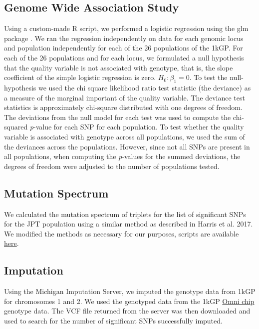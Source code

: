\documentclass[9pt,lineno]{elife}
\begin{document}
\subsection{Genome Wide Association Study}
Using a custom-made R script, we performed a logistic regression using the glm package \citep{RDevelopmentCoreTeam2016}.
We ran the regression independently on data for each genomic locus and population independently for each of the 26 populations of the 1kGP.
For each of the 26 populations and for each locus, we formulated a null hypothesis that the quality variable is not associated with genotype, that is, the slope  coefficient of the simple logistic regression is zero. 
$H_{0}: \beta_{1}=0$.  
To test the null-hypothesis we used the chi square likelihood ratio test statistic (the deviance) as a measure of the marginal important of the quality variable. 
The deviance test statistics is approximately chi-square distributed with one degrees of freedom.  
The deviations from the null model for each test was used to compute the chi-squared \textit{p}-value for each SNP for each population.
To test whether the quality variable is associated with genotype across all populations, we used the sum of the deviances across the populations.
However, since not all SNPs are present in all populations, when computing the \textit{p}-values for the summed deviations, the degrees of freedom were adjusted to the number of populations tested. 

\subsection{Mutation Spectrum}
We calculated the mutation spectrum of triplets for the list of significant SNPs for the JPT population using a similar method as described in Harris et al. 2017. \citep{Harris2017a}
We modified the methods as necessary for our purposes, scripts are available \href{https://github.com/LukeAndersonTrocme/QualityPaper}{here}. 

\subsection{Imputation}
Using the Michigan Imputation Server, we imputed the genotype data from 1kGP for chromosomes 1 and 2.
We used the genotyped data from the 1kGP \href{ftp://ftp.1000genomes.ebi.ac.uk/vol1/ftp/release/20130502/supporting/hd_genotype_chip/ALL.chip.omni_broad_sanger_combined.20140818.snps.genotypes.vcf.gz}{Omni chip} genotype data.
The VCF file returned from the server was then downloaded and used to search for the number of significant SNPs successfully imputed.
\end{document}
